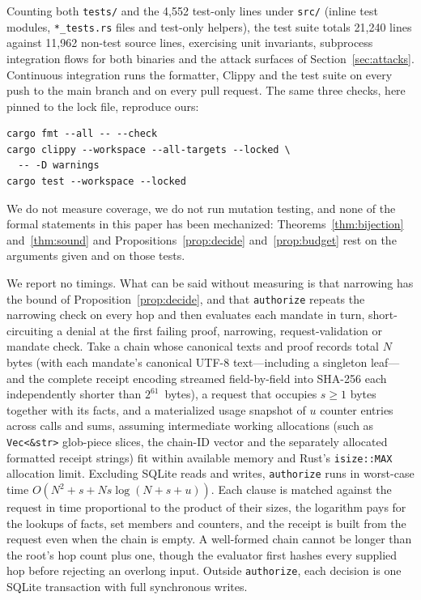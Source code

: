 \documentclass[10pt,twocolumn]{article}
\theoremstyle{plain}
\theoremstyle{definition}
\begin{document}
Counting both \texttt{tests/} and the 4{,}552 test-only lines under \texttt{src/} (inline test modules, \texttt{*\_tests.rs} files and test-only helpers), the test suite totals 21{,}240 lines against 11{,}962 non-test source lines, exercising unit invariants, subprocess integration flows for both binaries and the attack surfaces of Section~\ref{sec:attacks}. Continuous integration runs the formatter, Clippy and the test suite on every push to the main branch and on every pull request. The same three checks, here pinned to the lock file, reproduce ours:
\begin{lstlisting}
cargo fmt --all -- --check
cargo clippy --workspace --all-targets --locked \
  -- -D warnings
cargo test --workspace --locked
\end{lstlisting}
We do not measure coverage, we do not run mutation testing, and none of the formal statements in this paper has been mechanized: Theorems~\ref{thm:bijection} and~\ref{thm:sound} and Propositions~\ref{prop:decide} and~\ref{prop:budget} rest on the arguments given and on those tests.

We report no timings. What can be said without measuring is that narrowing has the bound of Proposition~\ref{prop:decide}, and that \texttt{authorize} repeats the narrowing check on every hop and then evaluates each mandate in turn, short-circuiting a denial at the first failing proof, narrowing, request-validation or mandate check. Take a chain whose canonical texts and proof records total $N$ bytes (with each mandate's canonical UTF-8 text---including a singleton leaf---and the complete receipt encoding streamed field-by-field into SHA-256 each independently shorter than $2^{61}$~bytes), a request that occupies $s \ge 1$ bytes together with its facts, and a materialized usage snapshot of $u$ counter entries across calls and sums, assuming intermediate working allocations (such as \texttt{Vec<\&str>} glob-piece slices, the chain-ID vector and the separately allocated formatted receipt strings) fit within available memory and Rust's \texttt{isize::MAX} allocation limit. Excluding SQLite reads and writes, \texttt{authorize} runs in worst-case time $O(N^2 + s + N s \log(N + s + u))$. Each clause is matched against the request in time proportional to the product of their sizes, the logarithm pays for the lookups of facts, set members and counters, and the receipt is built from the request even when the chain is empty. A well-formed chain cannot be longer than the root's hop count plus one, though the evaluator first hashes every supplied hop before rejecting an overlong input. Outside \texttt{authorize}, each decision is one SQLite transaction with full synchronous writes.
\end{document}
